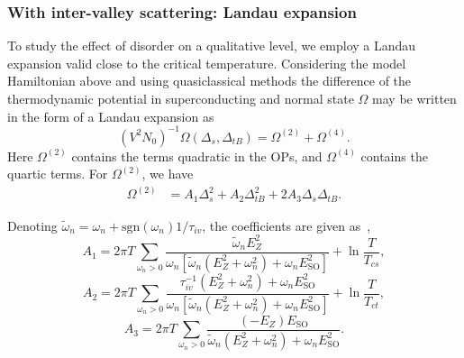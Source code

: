 \documentclass[showpacs,superscriptaddress,onecolumn,prb]{revtex4}
\begin{document}
\subsubsection{With inter-valley scattering: Landau expansion}


To study the effect of disorder on a qualitative level, we employ a Landau expansion valid close to the critical temperature. 
Considering the model Hamiltonian above and using quasiclassical methods
the difference of the thermodynamic potential in superconducting and
normal state $\Omega$ may be written in the form of a Landau expansion
as
\begin{equation}
\left(V^{2}N_{0}\right)^{-1}\Omega\left(\Delta_s,\Delta_{tB}\right)=\Omega^{\left(2\right)}+\Omega^{\left(4\right)}.\label{eq:1.11}
\end{equation}
Here $\Omega^{\left(2\right)}$ contains the terms quadratic in the
OPs, and $\Omega^{\left(4\right)}$ contains the quartic terms. For $\Omega^{\left(2\right)}$, we have
\begin{align}
\Omega^{\left(2\right)} & =A_{1}\Delta_s^{2}+A_{2}\Delta_{tB}^{2}+2A_{3}\Delta_s\Delta_{tB}. \label{eq:1.12}
\end{align}

Denoting $\tilde{\omega}_{n}=\omega_{n}+\mathrm{sgn}\left(\omega_{n}\right)1/\tau_{iv}$,
the coefficients are given as~\cite{Mockli2020}, 
\begin{equation}
A_{1}=2\pi T\underset{\omega_{n}>0}{\sum}\frac{\tilde{\omega}_{n}E_Z^{2}}{\omega_{n}\left[\tilde{\omega}_{n}\left(E_Z^{2}+\omega_{n}^{2}\right)+\omega_{n}E_{\mathrm{SO}}^{2}\right]}+\ln\frac{T}{T_{cs}},\label{eq:1.13}
\end{equation}
\begin{equation}
A_{2}=2\pi T\underset{\omega_{n}>0}{\sum}\frac{\tau_{iv}^{-1}\left(E_Z^{2}+\omega_{n}^{2}\right)+\omega_{n}E_{\mathrm{SO}}^{2}}{\omega_{n}\left[\tilde{\omega}_{n}\left(E_Z^{2}+\omega_{n}^{2}\right)+\omega_{n}E_{\mathrm{SO}}^{2}\right]}+\ln\frac{T}{T_{ct}},\label{eq:1.14}
\end{equation}
\begin{equation}
A_{3}=2\pi T\underset{\omega_{n}>0}{\sum}\frac{(-E_Z) E_{\mathrm{SO}}}{\tilde{\omega}_{n}\left(E_Z^{2}+\omega_{n}^{2}\right)+\omega_{n}E_{\mathrm{SO}}^{2}}.\label{eq:1.16}
\end{equation}
\end{document}

